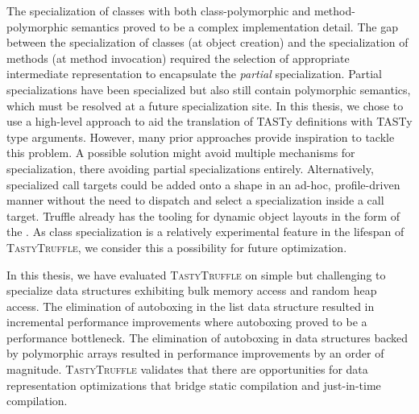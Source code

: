 The specialization of classes with both class-polymorphic and method-polymorphic semantics proved to be a complex implementation detail.
The gap between the specialization of classes (at object creation) and the specialization of methods (at method invocation) required the selection of appropriate intermediate representation to encapsulate the \textit{partial} specialization.
Partial specializations have been specialized but also still contain polymorphic semantics, which must be resolved at a future specialization site.
In this thesis, we chose to use a high-level approach to aid the translation of TASTy definitions with TASTy type arguments.
However, many prior approaches provide inspiration to tackle this problem.
A possible solution might avoid multiple mechanisms for specialization, there avoiding partial specializations entirely.
Alternatively, specialized call targets could be added onto a shape in an ad-hoc, profile-driven manner without the need to dispatch and select a specialization inside a call target.
Truffle already has the tooling for dynamic object layouts in the form of the .
As class specialization is a relatively experimental feature in the lifespan of \textsc{TastyTruffle}, we consider this a possibility for future optimization.

In this thesis, we have evaluated \textsc{TastyTruffle} on simple but challenging to specialize data structures exhibiting bulk memory access and random heap access.
The elimination of autoboxing in the list data structure resulted in incremental performance improvements where autoboxing proved to be a performance bottleneck.
The elimination of autoboxing in data structures backed by polymorphic arrays resulted in performance improvements by an order of magnitude.
\textsc{TastyTruffle} validates that there are opportunities for data representation optimizations that bridge static compilation and just-in-time compilation.

